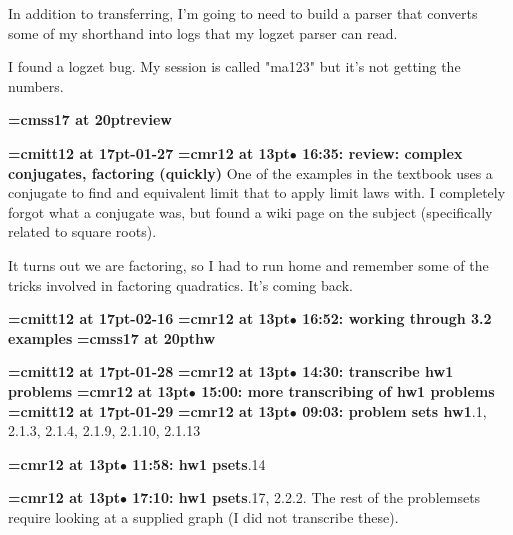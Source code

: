 In addition to transferring, I'm going to need to build a parser that converts some of my shorthand into logs that my logzet parser can read.
\par

I found a logzet bug. My session is called "ma123" but it's not getting the numbers.
\par

{\medskip\noindent\bf\font\titlefont=cmss17 at 20pt\titlefont review}\medskip

{\medskip\noindent\bf\font\titlefont=cmitt12 at 17pt-01-27}\medskip
{\smallskip\noindent\bf\font\titlefont=cmr12 at 13pt\titlefont $\bullet$ 16:35: review: complex conjugates, factoring (quickly)}\smallskip
One of the examples in the textbook uses a conjugate to find and equivalent limit that to apply limit laws with. I completely forgot what a conjugate was, but found a wiki page on the subject (specifically related to square roots).
\par

It turns out we are factoring, so I had to run home and remember some of the tricks involved in factoring quadratics. It's coming back.
\par

{\medskip\noindent\bf\font\titlefont=cmitt12 at 17pt-02-16}\medskip
{\smallskip\noindent\bf\font\titlefont=cmr12 at 13pt\titlefont $\bullet$ 16:52: working through 3.2 examples}\smallskip
{}
{\medskip\noindent\bf\font\titlefont=cmss17 at 20pt\titlefont hw}\medskip

{\medskip\noindent\bf\font\titlefont=cmitt12 at 17pt-01-28}\medskip
{\smallskip\noindent\bf\font\titlefont=cmr12 at 13pt\titlefont $\bullet$ 14:30: transcribe hw1 problems}\smallskip
{\smallskip\noindent\bf\font\titlefont=cmr12 at 13pt\titlefont $\bullet$ 15:00: more transcribing of hw1 problems}\smallskip
{\medskip\noindent\bf\font\titlefont=cmitt12 at 17pt-01-29}\medskip
{\smallskip\noindent\bf\font\titlefont=cmr12 at 13pt\titlefont $\bullet$ 09:03: problem sets hw1}.1, 2.1.3, 2.1.4, 2.1.9, 2.1.10, 2.1.13
\par

{\smallskip\noindent\bf\font\titlefont=cmr12 at 13pt\titlefont $\bullet$ 11:58: hw1 psets}.14
\par

{\smallskip\noindent\bf\font\titlefont=cmr12 at 13pt\titlefont $\bullet$ 17:10: hw1 psets}.17, 2.2.2. The rest of the problemsets require looking at a supplied graph (I did not transcribe these).
\par

